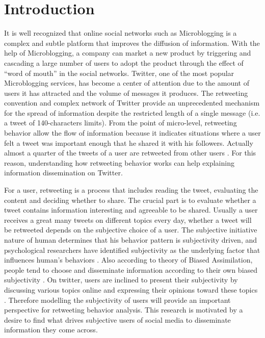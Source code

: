 \documentclass{acm_proc_article-sp}
\begin{document}
\section{Introduction}
\label{introduction}
\noindent It is well recognized that online social networks such as Microblogging is a complex and subtle platform that improves the diffusion of information. With the help of Microblogging, a company can market a new product by triggering and cascading a large number of users to adopt the product through the effect of ``word of mouth'' in the social networks. Twitter, one of the most popular Microblogging services, has become a center of attention due to the amount of users it has attracted and the volume of messages it produces. 
The retweeting convention and complex network of Twitter provide an unprecedented mechanism for the spread of information despite the restricted length of a single message (i.e. a tweet of 140-characters limits). From the point of micro-level, retweeting behavior allow the flow of information because it indicates situations where a user felt a tweet was important enough that he shared it with his followers. Actually almost a quarter of the tweets of a user are retweeted from other users \cite{yang2010understanding}. For this reason, understanding how retweeting behavior works can help explaining information dissemination on Twitter.

For a user, retweeting is a process that includes reading the tweet, evaluating the content and deciding whether to share. The crucial part is to evaluate whether a tweet contains information interesting and agreeable to be shared. Usually a user receives a great many tweets on different topics every day, whether a tweet will be retweeted depends on the subjective choice of a user. The subjective initiative nature of human determines that his behavior pattern is subjectivity driven, and psychological researchers have identified subjectivity as the underlying factor that influences human's behaviors \cite{moore2008awareness}. Also according to theory of Biased Assimilation, people tend to choose and disseminate information according to their own biased subjectivity \cite{Hyman2000}. On twitter, users are inclined to present their subjectivity by discussing various topics online and expressing their opinions toward these topics \cite{calais2011bias}. Therefore modelling the subjectivity of users will provide an important perspective for retweeting behavior analysis. This research is motivated by a desire to find what drives subjective users of social media to disseminate information they come across. 
\end{document}

